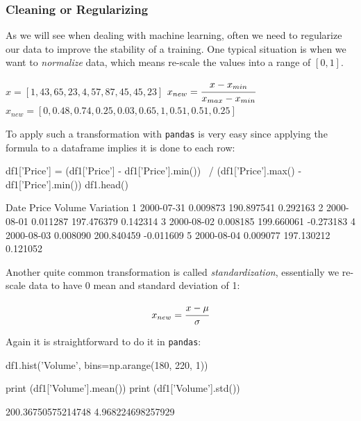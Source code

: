 \begin{ipython}
\subsubsection{Cleaning or Regularizing}\label{cleaning-or-regularizing}

As we will see when dealing with machine learning, often we need to regularize our data to 
improve the stability of a training. One typical situation is when we want to \emph{normalize} 
data, which means re-scale the values into a range of $[0, 1]$.

\(x = [1,43,65,23,4,57,87,45,45,23]\)
\vspace{0.5cm}
\(x_{new} = \cfrac{x - x_{min}}{x_{max} - x_{min}}\)
\vspace{0.5cm}
\(x_{new} = [0,0.48,0.74,0.25,0.03,0.65,1,0.51,0.51,0.25]\)

To apply such a transformation with \texttt{pandas} is very easy since applying the formula to a 
dataframe implies it is done to each row:

\begin{ipython}
df1['Price'] = (df1['Price'] - df1['Price'].min()) \
    / (df1['Price'].max() - df1['Price'].min())
df1.head()
\end{ipython}
\begin{ioutput}
        Date     Price      Volume  Variation
1 2000-07-31  0.009873  190.897541   0.292163
2 2000-08-01  0.011287  197.476379   0.142314
3 2000-08-02  0.008185  199.660061  -0.273183
4 2000-08-03  0.008090  200.840459  -0.011609
5 2000-08-04  0.009077  197.130212   0.121052
\end{ioutput}
        
Another quite common transformation is called \emph{standardization}, essentially we re-scale data to have 0 mean and standard deviation of 1:

\begin{equation}
x_{new} = \cfrac{x-\mu}{\sigma}
\label{eq:standardization}
\end{equation}

Again it is straightforward to do it in \texttt{pandas}:

\begin{ipython}
df1.hist('Volume', bins=np.arange(180, 220, 1))

print (df1['Volume'].mean())
print (df1['Volume'].std())
\end{ipython}
\begin{ioutput}
200.36750575214748
4.968224698257929
\end{ioutput}



\end{ipython}
